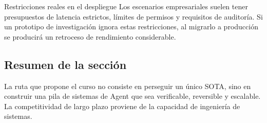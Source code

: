 \begin{warningbox}{Restricciones reales en el despliegue}
Los escenarios empresariales suelen tener presupuestos de latencia estrictos, límites de permisos y requisitos de auditoría. Si un prototipo de investigación ignora estas restricciones, al migrarlo a producción se producirá un retroceso de rendimiento considerable.
\end{warningbox}

\subsection{Resumen de la sección}
La ruta que propone el curso no consiste en perseguir un único SOTA, sino en construir una pila de sistemas de Agent que sea verificable, reversible y escalable. La competitividad de largo plazo proviene de la capacidad de ingeniería de sistemas.

